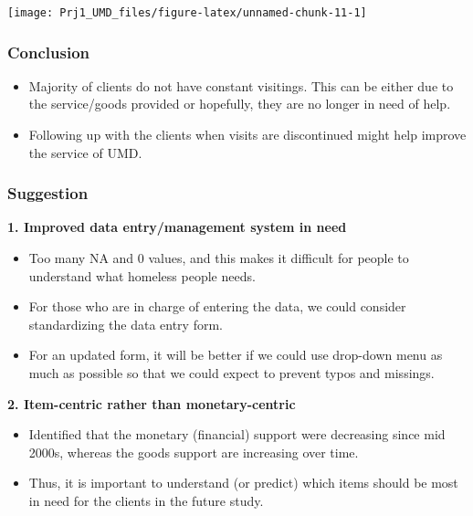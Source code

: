 \documentclass[]{article}
\providecommand{\tightlist}{%
  \setlength{\itemsep}{0pt}\setlength{\parskip}{0pt}}
\begin{document}
\begin{center}\texttt{[image: Prj1\_UMD\_files/figure-latex/unnamed-chunk-11-1]} \end{center}

\hypertarget{conclusion}{%
\subsubsection{Conclusion}\label{conclusion}}

\begin{itemize}
\tightlist
\item
  Majority of clients do not have constant visitings. This can be either
  due to the service/goods provided or hopefully, they are no longer in
  need of help.
\item
  Following up with the clients when visits are discontinued might help
  improve the service of UMD.
\end{itemize}

\hypertarget{suggestion}{%
\subsubsection{Suggestion}\label{suggestion}}

\textbf{1. Improved data entry/management system in need}

\begin{itemize}
\tightlist
\item
  Too many NA and 0 values, and this makes it difficult for people to
  understand what homeless people needs.
\item
  For those who are in charge of entering the data, we could consider
  standardizing the data entry form.
\item
  For an updated form, it will be better if we could use drop-down menu
  as much as possible so that we could expect to prevent typos and
  missings.
\end{itemize}

\textbf{2. Item-centric rather than monetary-centric}

\begin{itemize}
\tightlist
\item
  Identified that the monetary (financial) support were decreasing since
  mid 2000s, whereas the goods support are increasing over time.
\item
  Thus, it is important to understand (or predict) which items should be
  most in need for the clients in the future study.
\end{itemize}
\end{document}
